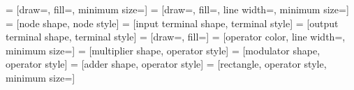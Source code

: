 %


%
%
%
   = [draw=\pathdrawcolor,
      fill=\pathdrawcolor,
      minimum size=\nodesize]
%
   = [draw=\pathdrawcolor,
      fill=\pathfillcolor,
      line width=\pathlinewidth,
      minimum size=\terminalsize]
%
   = [node shape,
      node style]
%
   = [input terminal shape,
      terminal style]
%
   = [output terminal shape,
      terminal style]
%
   = [draw=\operatordrawcolor,
      fill=\operatorfillcolor]
%
   = [operator color,
      line width=\operatorlinewidth,
      minimum size=\operatorsize]
%
   = [multiplier shape,
      operator style]
%
   = [modulator shape,
      operator style]
%
   = [adder shape,
      operator style]
%
   = [rectangle,
      operator style,
      minimum size=\delaysize]


%
%
\newcommand{\circularshape}[1]{%
  \savedanchor\centerpoint{\pgfpointorigin}
  \saveddimen\radius{%
    \setlength{\pgf@xa}{\pgfshapeminwidth}
    \setlength{\pgf@ya}{\pgfshapeminheight}
    \ifdim\pgf@xa>\pgf@ya
      \pgf@x=.5\pgf@xa
    \else
      \pgf@x=.5\pgf@ya
    \fi
  }
  \inheritanchor[from=circle]{center}
  \inheritanchorborder[from=circle]
  \inheritanchor[from=circle]{north}
  \inheritanchor[from=circle]{north east}
  \inheritanchor[from=circle]{east}
  \inheritanchor[from=circle]{south east}
  \inheritanchor[from=circle]{south}
  \inheritanchor[from=circle]{south west}
  \inheritanchor[from=circle]{west}
  \inheritanchor[from=circle]{north west}
  \inheritanchor[from=circle]{mid}
  \inheritanchor[from=circle]{mid west}
  \inheritanchor[from=circle]{mid east}
  \inheritanchor[from=circle]{base}
  \inheritanchor[from=circle]{base west}
  \inheritanchor[from=circle]{base east}
  \inheritbackgroundpath[from=circle]
  \foregroundpath{
    \centerpoint%
    \pgf@xc=\pgf@x%
    \pgf@yc=\pgf@y%
    \@tempdima=\radius%
    #1
  }
  \nodeparts{}
}

